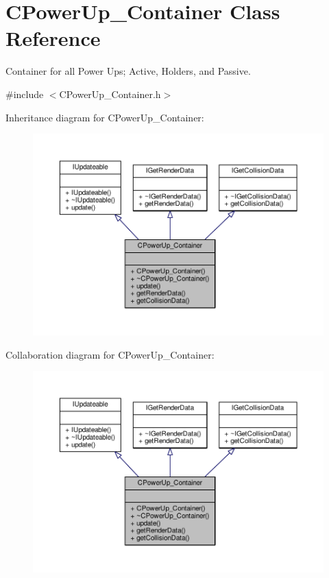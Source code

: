 \hypertarget{classCPowerUp__Container}{\section{C\-Power\-Up\-\_\-\-Container Class Reference}
\label{classCPowerUp__Container}
}


Container for all Power Ups; Active, Holders, and Passive.  




{\ttfamily \#include $<$C\-Power\-Up\-\_\-\-Container.\-h$>$}



Inheritance diagram for C\-Power\-Up\-\_\-\-Container\-:
\nopagebreak
\begin{figure}[H]
\begin{center}
\leavevmode
\includegraphics[width=350pt]{classCPowerUp__Container__inherit__graph}
\end{center}
\end{figure}


Collaboration diagram for C\-Power\-Up\-\_\-\-Container\-:
\nopagebreak
\begin{figure}[H]
\begin{center}
\leavevmode
\includegraphics[width=350pt]{classCPowerUp__Container__coll__graph}
\end{center}
\end{figure}
